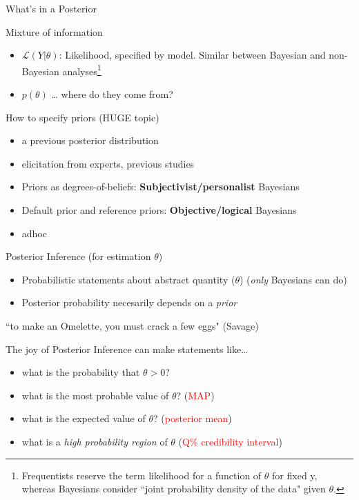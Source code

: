\documentclass[presentation,9pt,xcolor=dvipsnames]{beamer}
\begin{document}
\begin{frame}[label={sec:org68c8d06}]{What's in a Posterior}
\begin{block}{Mixture of information}
\begin{itemize}
\item \(\mathcal{L}(Y\vert\theta)\): Likelihood, specified by model. Similar between Bayesian and non-Bayesian analyses\footnote{Frequentists reserve the term likelihood for a function of $\theta$ for fixed y, whereas Bayesians consider ``joint probability density of the data" given $\theta$.}
\item \(p(\theta)\) \ldots{} where do they come from?
\end{itemize}
\end{block}
\begin{block}{How to specify priors (HUGE topic)}
\begin{itemize}
\item a previous posterior distribution
\item elicitation from experts, previous studies
\item Priors as degrees-of-beliefs: \textbf{Subjectivist/personalist} Bayesians
\item Default prior and reference priors: \textbf{Objective/logical} Bayesians
\item adhoc
\end{itemize}
\end{block}
\end{frame}
\begin{frame}[label={sec:org26142c7}]{Posterior Inference (for estimation \(\theta\))}
\begin{itemize}
\item Probabilistic statements about abstract quantity (\(\theta\)) (\emph{only} Bayesians can do)
\item Posterior probability necesarily depends on a \emph{prior}
\end{itemize}
``to make an Omelette, you must crack a few eggs" (Savage)
\begin{block}{The joy of Posterior Inference}
can make statements like\ldots{}
\begin{itemize}
\item what is the probability that \(\theta>0\)?
\item what is the most probable value of \(\theta\)? (\textcolor{red}{MAP})
\item what is the expected value of \(\theta\)? (\textcolor{red}{posterior mean})
\item what is a \emph{high probability region} of \(\theta\) (\textcolor{red}{Q\% credibility interval})
\end{itemize}
\end{block}
\end{frame}
\end{document}
